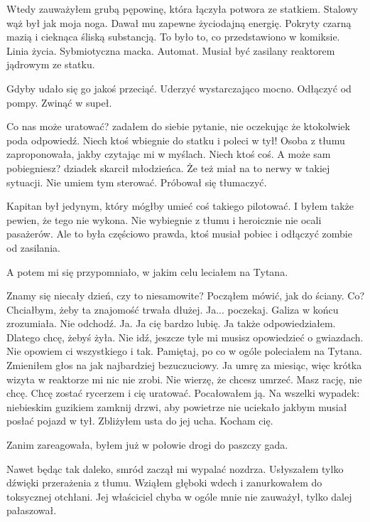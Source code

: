 Wtedy zauważyłem grubą pępowinę, która łączyła potwora ze statkiem.
Stalowy wąż był jak moja noga. Dawał mu zapewne życiodajną energię.
Pokryty czarną mazią i cieknąca śliską substancją.
To było to, co przedstawiono w komiksie.
Linia życia. Sybmiotyczna macka. Automat. Musiał być zasilany reaktorem jądrowym ze statku.

Gdyby udało się go jakoś przeciąć.
Uderzyć wystarczająco mocno.
Odłączyć od pompy.
Zwinąć w supeł.

\begin{dialogue}
	\ds{} Co nas może uratować? \dm{} zadałem do siebie pytanie, nie oczekując że ktokolwiek poda odpowiedź.
	\ds{} Niech ktoś wbiegnie do statku i poleci w tył! \dm{} Osoba z tłumu zaproponowała, jakby czytając mi w myślach. \dm{} Niech ktoś coś.
	\ds{} A może sam pobiegniesz? \dm{} dziadek skarcił młodzieńca. Że też miał na to nerwy w takiej sytuacji.
	\ds{} Nie umiem tym sterować. \dm{} Próbował się tłumaczyć.
\end{dialogue}

Kapitan był jedynym, który mógłby umieć coś takiego pilotować.
I byłem także pewien, że tego nie wykona.
Nie wybiegnie z tłumu i heroicznie nie ocali pasażerów.
Ale to była częściowo prawda, ktoś musiał pobiec i odłączyć zombie od zasilania. 

A potem mi się przypomniało, w jakim celu leciałem na Tytana.
\begin{dialogue}
	\ds{} Znamy się niecały dzień, czy to niesamowite? \dm{} Począłem mówić, jak do ściany.
	\ds{} Co?
	\ds{} Chciałbym, żeby ta znajomość trwała dłużej.
	\ds{} Ja... poczekaj. \dm{} Galiza w końcu zrozumiała. \dm{} Nie odchodź. Ja. Ja cię bardzo lubię.
	\ds{} Ja także \dm{} odpowiedziałem. \dm{} Dlatego chcę, żebyś żyła.
	\ds{} Nie idź, jeszcze tyle mi musisz opowiedzieć o gwiazdach.
	\ds{} Nie opowiem ci wszystkiego i tak. Pamiętaj, po co w ogóle poleciałem na Tytana. \dm{} Zmieniłem głos na jak najbardziej bezuczuciowy. \dm{} Ja umrę za miesiąc, więc krótka wizyta w reaktorze mi nic nie zrobi.
	\ds{} Nie wierzę, że chcesz umrzeć.
	\ds{} Masz rację, nie chcę. Chcę zostać rycerzem i cię uratować. \dm{} Pocałowałem ją. \dm{} Na wszelki wypadek: niebieskim guzikiem zamknij drzwi, aby powietrze nie uciekało jakbym musiał posłać pojazd w tył. \dm{} Zbliżyłem usta do jej ucha. \dm{} Kocham cię.
\end{dialogue}

Zanim zareagowała, byłem już w połowie drogi do paszczy gada.

Nawet będąc tak daleko, smród zaczął mi wypalać nozdrza.
Usłyszałem tylko dźwięki przerażenia z tłumu.
Wziąłem głęboki wdech i zanurkowałem do toksycznej otchłani.
Jej właściciel chyba w ogóle mnie nie zauważył, tylko dalej pałaszował.

